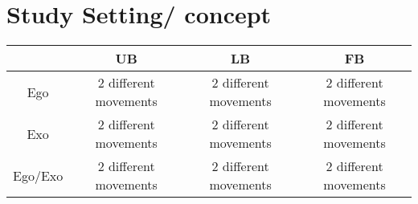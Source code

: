 \chapter{Study Setting/ concept}

\begin{center}
	\begin{tabular}{ | c | c | c | c | }
		\hline
		 & UB & LB & FB \\ \hline 
		Ego & 2 different movements & 2 different movements &2 different movements \\ \hline 
		Exo & 2 different movements & 2 different movements & 2 different movements \\ \hline
		Ego/Exo & 2 different movements & 2 different movements & 2 different movements \\
		\hline
	\end{tabular}
\end{center}